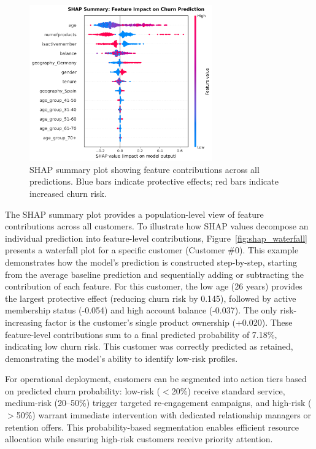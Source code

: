 \documentclass[12pt]{article}
\begin{document}
\begin{figure}[H]
\centering
\includegraphics[width=0.7\textwidth]{../img/20_shap_summary.png}
\caption{SHAP summary plot showing feature contributions across all predictions. Blue bars indicate protective effects; red bars indicate increased churn risk.}
\label{fig:shap}
\end{figure}

The SHAP summary plot provides a population-level view of feature contributions across all customers. To illustrate how SHAP values decompose an individual prediction into feature-level contributions, Figure~\ref{fig:shap_waterfall} presents a waterfall plot for a specific customer (Customer \#0). This example demonstrates how the model's prediction is constructed step-by-step, starting from the average baseline prediction and sequentially adding or subtracting the contribution of each feature. For this customer, the low age (26 years) provides the largest protective effect (reducing churn risk by 0.145), followed by active membership status (-0.054) and high account balance (-0.037). The only risk-increasing factor is the customer's single product ownership (+0.020). These feature-level contributions sum to a final predicted probability of 7.18\%, indicating low churn risk. This customer was correctly predicted as retained, demonstrating the model's ability to identify low-risk profiles.

For operational deployment, customers can be segmented into action tiers based on predicted churn probability: low-risk ($<$20\%) receive standard service, medium-risk (20–50\%) trigger targeted re-engagement campaigns, and high-risk ($>$50\%) warrant immediate intervention with dedicated relationship managers or retention offers. This probability-based segmentation enables efficient resource allocation while ensuring high-risk customers receive priority attention.
\end{document}
